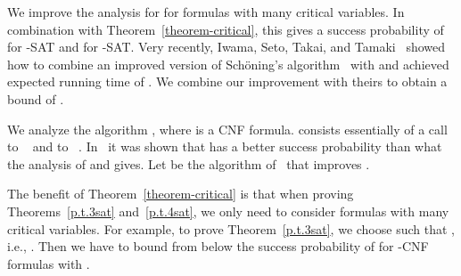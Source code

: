 We improve the analysis for  for formulas with many critical
variables. In combination with Theorem~\ref{theorem-critical}, this
gives a success probability of 
for -SAT and  for -SAT\@.
Very recently, Iwama, Seto, Takai, and Tamaki~\cite{istt10} showed
how to combine an improved version of Sch\"oning's
algorithm~\cite{hofmeister02,bs03} with  and achieved expected running time of . We combine our improvement with
theirs to obtain a bound of .
\introductionAppendixExplanation

We analyze the algorithm , where  is a CNF formula.
 consists essentially of a call to ~\cite{ppsz} and to
~\cite{schoning1999}. In~\cite{it04} it was shown that
 has a better success probability than what the analysis of  and
 gives. Let  be the algorithm of~\cite{istt10} that improves .
\begin{theorem}
\label{p.t.3sat}
\end{theorem}
\begin{theorem}
\label{guess-istt}
\end{theorem}
\theoremAppendixExplanation
\begin{theorem}
\label{guess-istt-weak}
\end{theorem}

\begin{theorem}
\label{p.t.4sat}
\end{theorem}
The benefit of Theorem~\ref{theorem-critical} is that when proving
Theorems~\ref{p.t.3sat} and~\ref{p.t.4sat}, we only need to consider
formulas with many critical variables.  For example, to prove
Theorem~\ref{p.t.3sat}, we choose  such that , i.e., . Then we have to bound from
below the success probability of  for -CNF formulas  with
.
